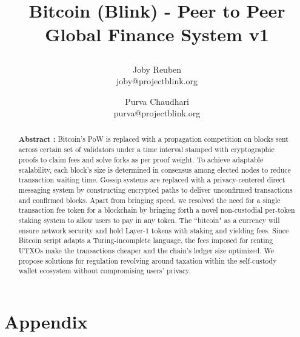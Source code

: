 \documentclass[a4paper,10pt]{article}
\title{
 \large \textbf{Bitcoin (Blink) - Peer to Peer Global Finance System v1}
\author{ \myfontt Joby Reuben \\ \myfontt joby@projectblink.org \and  \myfontt Purva Chaudhari \\ \myfontt purva@projectblink.org}}
\date{}
\begin{document}
\maketitle
\begin{abstract}
\noindent \textbf{Abstract :} Bitcoin's PoW is replaced with a propagation competition on blocks sent across certain set of validators under a time interval stamped with cryptographic proofs to claim fees and solve forks as per proof weight. To achieve adaptable scalability, each block's size is determined in consensus among elected nodes to reduce transaction waiting time. Gossip systems are replaced with a privacy-centered direct messaging system by constructing encrypted paths to deliver unconfirmed transactions and confirmed blocks. Apart from bringing speed, we resolved the need for a single transaction fee token for a blockchain by bringing forth a novel non-custodial per-token staking system to allow users to pay in any token. The ``bitcoin" as a currency will ensure network security and hold Layer-1 tokens with staking and yielding fees. Since Bitcoin script adapts a Turing-incomplete language, the fees imposed for renting UTXOs make the transactions cheaper and the chain's ledger size optimized. We propose solutions for regulation revolving around taxation within the self-custody wallet ecosystem without compromising users' privacy. 
\end{abstract}















\newpage
\normalsize
\appendix
\section{Appendix}
















\end{document}
